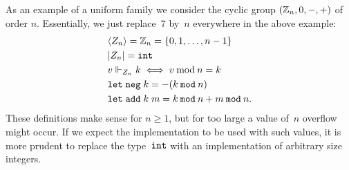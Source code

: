 As an example of a uniform family we consider the cyclic group
$(\mathbb{Z}_n, 0, {-}, {+})$ of order $n$. Essentially, we just replace~$7$
by~$n$ everywhere in the above example:
%
\begin{align*}
  & \langle Z_n \rangle = \mathbb{Z}_n = \{0, 1, \ldots, n - 1\}
  \\
  & |Z_n| = \mathtt{int}
  \\
  & v \Vdash_{Z_n} k \iff v \mathbin{\mathrm{mod}} n = k
  \\
  & \mathtt{let}\;\mathtt{neg}\; k  = - (k \mathbin{\mathtt{mod}} n)
  \\
  & \mathtt{let}\;\mathtt{add}\; k \; m = k \mathbin{\mathtt{mod}} n + m \mathbin{\mathtt{mod}} n.
\end{align*}
%
These definitions make sense for $n \geq 1$, but for too large a value
of~$n$ overflow might occur. If we expect the implementation to be
used with such values, it is more prudent to replace the type~$\mathtt{int}$
with an implementation of arbitrary size integers.


